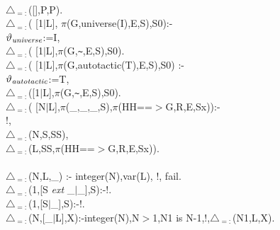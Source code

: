 \documentclass[11pt]{report}
\begin{document}
\begin{sf}\begin{tabbing}
\hspace{1em}\\[-0.15ex]
$\triangle_{=:}$([],P,P).\\[-0.15ex]
$\triangle_{=:}$( [1$\mid$L], $\pi$(G,universe(I),E,S),S0):-\\[-0.15ex]
\hspace{2em}$\vartheta_{\it universe}$:=I, \\[-0.15ex]
\hspace{2em}$\triangle_{=:}$( [1$\mid$L],$\pi$(G,{\verb`~`},E,S),S0).\\[-0.15ex]
$\triangle_{=:}$( [1$\mid$L],$\pi$(G,autotactic(T),E,S),S0) :-\\[-0.15ex]
\hspace{2em}$\vartheta_{\it autotactic}$:=T, \\[-0.15ex]
\hspace{2em}$\triangle_{=:}$([1$\mid$L],$\pi$(G,{\verb`~`},E,S),S0).\\[-0.15ex]
$\triangle_{=:}$( [N$\mid$L],$\pi$(\_\hspace{0.1em},\_\hspace{0.1em},\_\hspace{0.1em},S),$\pi$(HH==$>$G,R,E,Sx)):-\\[-0.15ex]
\hspace{2em}!,\\[-0.15ex]
\hspace{2em}$\triangle_{=:}$(N,S,SS),\\[-0.15ex]
\hspace{2em}$\triangle_{=:}$(L,SS,$\pi$(HH==$>$G,R,E,Sx)).\\[-0.7ex]
\\[-0.15ex]
$\triangle_{=:}$(N,L,\_\hspace{0.1em}) :- integer(N),var(L), !, fail.\\[-0.15ex]
$\triangle_{=:}$(1,[S \mbox{\it ext} \_\hspace{0.1em}$\mid$\_\hspace{0.1em}],S):-!.\\[-0.15ex]
$\triangle_{=:}$(1,[S$\mid$\_\hspace{0.1em}],S):-!.\\[-0.15ex]
$\triangle_{=:}$(N,[\_\hspace{0.1em}$\mid$L],X):-integer(N),N$>$1,N1 is N-1,!,$\triangle_{=:}$(N1,L,X).\\[-0.7ex]

\end{tabbing}\end{sf}
\end{document}

